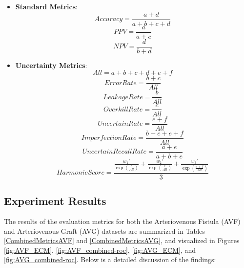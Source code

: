 \documentclass{ieeeaccess}
\begin{document}
\begin{itemize}
  \item \textbf{Standard Metrics}: 
    \begin{equation}
        Accuracy = \frac{a + d}{a + b + c + d}
    \end{equation}
    \begin{equation}
        PPV = \frac{a}{a + c}
    \end{equation}
    \begin{equation}
        NPV = \frac{d}{b + d}
    \end{equation}
  \item \textbf{Uncertainty Metrics}: 
    \begin{equation}
        All = a + b + c + d + e + f
    \end{equation}
    \begin{equation}
        Error Rate = \frac{b + c}{All}
    \end{equation}
    \begin{equation}
        Leakage Rate = \frac{b}{All}
    \end{equation}
    \begin{equation}
        Overkill Rate = \frac{c}{All}
    \end{equation}
    \begin{equation}
        Uncertain Rate = \frac{e + f}{All}
    \end{equation}
    \begin{equation}
        Imperfection Rate = \frac{b + c + e + f}{All}
    \end{equation}
    \begin{equation}
        Uncertain Recall Rate = \frac{a + e}{a + b + e}
    \end{equation}
    \begin{equation}
        Harmonic Score = \frac{\frac{w_1'}{\exp\left(\frac{b}{All}\right)} + \frac{w_2'}{\exp\left(\frac{c}{All}\right)} + \frac{w_3'}{\exp\left(\frac{e + f}{All}\right)}}{3}
    \end{equation}
\end{itemize}

\subsection{Experiment Results}

The results of the evaluation metrics for both the Arteriovenous Fistula (AVF) and Arteriovenous Graft (AVG) datasets are summarized in Tables \ref{CombinedMetricsAVF} and \ref{CombinedMetricsAVG}, and visualized in Figures \ref{fig:AVF_ECM}, \ref{fig:AVF_combined-roc}, \ref{fig:AVG_ECM}, and \ref{fig:AVG_combined-roc}. Below is a detailed discussion of the findings:
\end{document}
